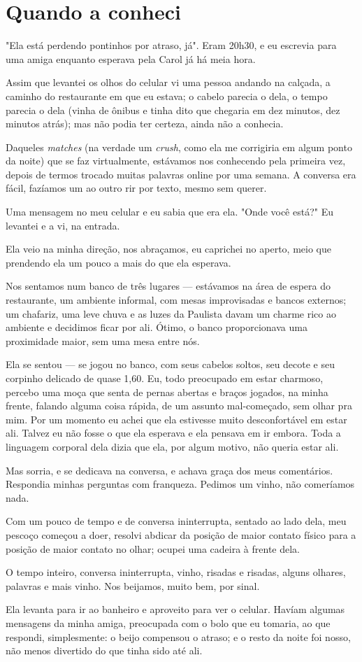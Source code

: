 \documentclass[11pt,a4paper,twoside,openany]{book}
\begin{document}
\chapter*{Quando a conheci}

"Ela está perdendo pontinhos por atraso, já". Eram 20h30, e eu escrevia para uma amiga enquanto esperava pela Carol já há meia hora.

Assim que levantei os olhos do celular vi uma pessoa andando na calçada, a caminho do restaurante em que eu estava; o cabelo parecia o dela, o tempo parecia o dela (vinha de ônibus e tinha dito que chegaria em dez minutos, dez minutos atrás); mas não podia ter certeza, ainda não a conhecia.

Daqueles \emph{matches} (na verdade um \emph{crush}, como ela me corrigiria em algum ponto da noite) que se faz virtualmente, estávamos nos conhecendo pela primeira vez, depois de termos trocado muitas palavras online por uma semana. A conversa era fácil, fazíamos um ao outro rir por texto, mesmo sem querer.

Uma mensagem no meu celular e eu sabia que era ela. "Onde você está?" Eu levantei e a vi, na entrada.

Ela veio na minha direção, nos abraçamos, eu caprichei no aperto, meio que prendendo ela um pouco a mais do que ela esperava.

Nos sentamos num banco de três lugares --- estávamos na área de espera do restaurante, um ambiente informal, com mesas improvisadas e bancos externos; um chafariz, uma leve chuva e as luzes da Paulista davam um charme rico ao ambiente e decidimos ficar por ali. Ótimo, o banco proporcionava uma proximidade maior, sem uma mesa entre nós.

Ela se sentou --- se jogou no banco, com seus cabelos soltos, seu decote e seu corpinho delicado de quase 1,60. Eu, todo preocupado em estar charmoso, percebo uma moça que senta de pernas abertas e braços jogados, na minha frente, falando alguma coisa rápida, de um assunto mal-começado, sem olhar pra mim. Por um momento eu achei que ela estivesse muito desconfortável em estar ali. Talvez eu não fosse o que ela esperava e ela pensava em ir embora. Toda a linguagem corporal dela dizia que ela, por algum motivo, não queria estar ali.

Mas sorria, e se dedicava na conversa, e achava graça dos meus comentários. Respondia minhas perguntas com franqueza. Pedimos um vinho, não comeríamos nada.

Com um pouco de tempo e de conversa ininterrupta, sentado ao lado dela, meu pescoço começou a doer, resolvi abdicar da posição de maior contato físico para a posição de maior contato no olhar; ocupei uma cadeira à frente dela.

O tempo inteiro, conversa ininterrupta, vinho, risadas e risadas, alguns olhares, palavras e mais vinho. Nos beijamos, muito bem, por sinal.

Ela levanta para ir ao banheiro e aproveito para ver o celular. Havíam algumas mensagens da minha amiga, preocupada com o bolo que eu tomaria, ao que respondi, simplesmente: o beijo compensou o atraso; e o resto da noite foi nosso, não menos divertido do que tinha sido até ali.
\end{document}
